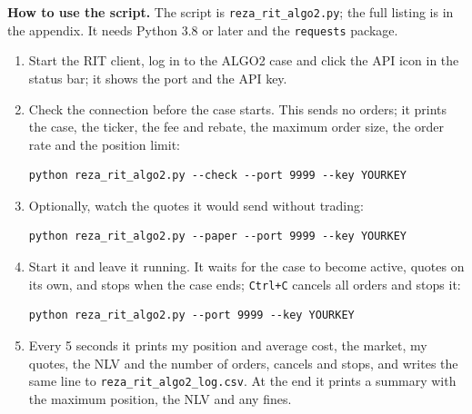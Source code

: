 \documentclass{article}
\begin{document}
\textbf{How to use the script.} The script is \texttt{reza\_rit\_algo2.py}; the full listing is in the
appendix. It needs Python 3.8 or later and the \texttt{requests} package.
\begin{enumerate}
  \item Start the RIT client, log in to the ALGO2 case and click the API icon in the status bar; it shows
        the port and the API key.
  \item Check the connection before the case starts. This sends no orders; it prints the case, the
        ticker, the fee and rebate, the maximum order size, the order rate and the position limit:
\begin{verbatim}
python reza_rit_algo2.py --check --port 9999 --key YOURKEY
\end{verbatim}
  \item Optionally, watch the quotes it would send without trading:
\begin{verbatim}
python reza_rit_algo2.py --paper --port 9999 --key YOURKEY
\end{verbatim}
  \item Start it and leave it running. It waits for the case to become active, quotes on its own, and
        stops when the case ends; \texttt{Ctrl+C} cancels all orders and stops it:
\begin{verbatim}
python reza_rit_algo2.py --port 9999 --key YOURKEY
\end{verbatim}
  \item Every 5 seconds it prints my position and average cost, the market, my quotes, the NLV and the
        number of orders, cancels and stops, and writes the same line to \texttt{reza\_rit\_algo2\_log.csv}.
        At the end it prints a summary with the maximum position, the NLV and any fines.
\end{enumerate}
\end{document}
